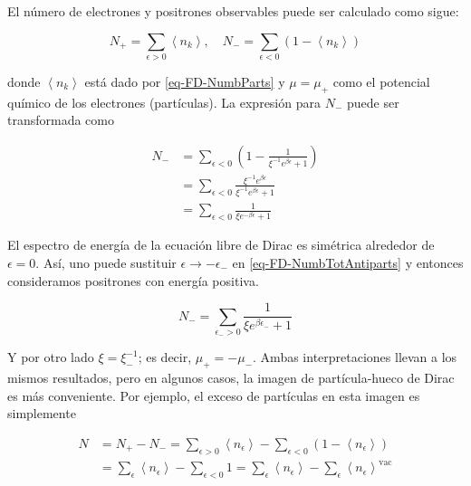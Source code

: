 El número de electrones y positrones observables puede ser calculado como sigue:

\begin{equation}\label{eq-FD-NumbPartsAndAntiparts}
{N}_{+} = \sum_{\epsilon>0} \left\langle {n}_{k} \right\rangle, \quad {N}_{-} = \sum_{\epsilon<0} \left(1 - \left\langle {n}_{k} \right\rangle \right)
\end{equation}

donde $\left\langle {n}_{k} \right\rangle$ está dado por \eqref{eq-FD-NumbParts} y ${\mu} = {\mu}_{+}$ como el potencial químico de los electrones (partículas). La expresión para ${N}_{-}$ puede ser transformada como

\begin{equation}\label{eq-FD-NumbTotAntiparts}
\begin{split}
{N}_{-} & = \sum_{\epsilon < 0} \left( 1 - \frac{1}{{\xi}^{-1}{e}^{\beta{\epsilon}} + 1} \right)  \\
& = \sum_{\epsilon < 0}\frac{{\xi}^{-1}{e}^{\beta \epsilon}}{{\xi}^{-1}{e}^{\beta{\epsilon}} + 1} \\
& = \sum_{\epsilon<0} \frac{1}{{\xi}{e}^{-\beta{\epsilon}} + 1}
\end{split}
\end{equation}

El espectro de energía de la ecuación libre de Dirac es simétrica alrededor de $\epsilon=0$. Así, uno puede sustituir $\epsilon \rightarrow -{\epsilon}_{-}$ en \eqref{eq-FD-NumbTotAntiparts} y entonces consideramos positrones con energía positiva.

\begin{equation}
{N}_{-} = \sum_{{\epsilon}_{-}>0} \frac{1}{{\xi}{e}^{\beta{\epsilon}_{-}}+1}
\end{equation}

Y por otro lado ${\xi} = {\xi}_{-}^{-1}$; es decir, ${\mu}_{+} = - {\mu}_{-}$. Ambas interpretaciones llevan a los mismos resultados, pero en algunos casos, la imagen de partícula-hueco de Dirac es más conveniente. Por ejemplo, el exceso de partículas en esta imagen es simplemente

\begin{equation}
\begin{split}
N & = {N}_{+} - {N}_{-} = \sum_{\epsilon > 0} \left\langle {n}_{\epsilon} \right\rangle - \sum_{\epsilon < 0} \left(1 - \left\langle {n}_{\epsilon} \right\rangle \right) \\
& = \sum_{\epsilon} \left\langle {n}_{\epsilon} \right\rangle  - \sum _{\epsilon < 0} 1 = \sum_{\epsilon} \left\langle {n}_{\epsilon} \right\rangle  - \sum_{\epsilon} \left\langle {n}_{\epsilon} \right\rangle ^{\mathrm{vac}}
\end{split}
\end{equation}


